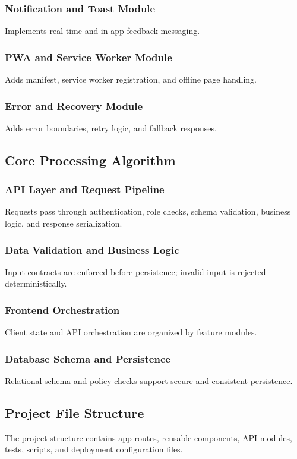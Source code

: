 \documentclass[12pt,a4paper]{article}
\begin{document}
\subsubsection{Notification and Toast Module}
Implements real-time and in-app feedback messaging.

\subsubsection{PWA and Service Worker Module}
Adds manifest, service worker registration, and offline page handling.

\subsubsection{Error and Recovery Module}
Adds error boundaries, retry logic, and fallback responses.

\subsection{Core Processing Algorithm}

\subsubsection{API Layer and Request Pipeline}
Requests pass through authentication, role checks, schema validation, business logic, and response serialization.

\subsubsection{Data Validation and Business Logic}
Input contracts are enforced before persistence; invalid input is rejected deterministically.

\subsubsection{Frontend Orchestration}
Client state and API orchestration are organized by feature modules.

\subsubsection{Database Schema and Persistence}
Relational schema and policy checks support secure and consistent persistence.

\subsection{Project File Structure}
The project structure contains app routes, reusable components, API modules, tests, scripts, and deployment configuration files.
\end{document}
